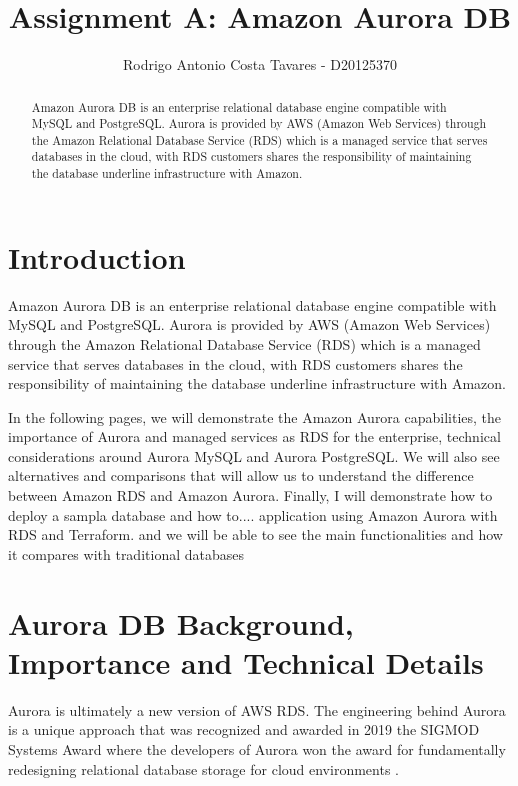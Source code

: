 \documentclass{article}
\date{\parbox{\linewidth}{\centering%
  \today\endgraf\bigskip
  Advanced Databases – TU60 2021/2022 - Brendand Tierney}}
\title  {Assignment A: Amazon Aurora DB}
\author{Rodrigo Antonio Costa Tavares - D20125370}
\begin{document}
\maketitle
\thispagestyle{empty}
\begin{abstract}
Amazon Aurora DB is an enterprise relational database engine compatible with MySQL and PostgreSQL. Aurora is provided by AWS (Amazon Web Services) through the Amazon Relational Database Service (RDS) which is a managed service that serves databases in the cloud, with RDS customers shares the responsibility of maintaining the database underline infrastructure with Amazon.
\end{abstract}

\clearpage
\tableofcontents
\clearpage
\listoffigures
\clearpage

\section{Introduction}

Amazon Aurora DB is an enterprise relational database engine compatible with MySQL and PostgreSQL. Aurora is provided by AWS (Amazon Web Services) through the Amazon Relational Database Service (RDS) which is a managed service that serves databases in the cloud, with RDS customers shares the responsibility of maintaining the database underline infrastructure with Amazon\cite{todorov2013aws}.

In the following pages, we will demonstrate the Amazon Aurora capabilities, the importance of Aurora and managed services as RDS for the enterprise, technical considerations around Aurora MySQL and Aurora PostgreSQL.  We will also see alternatives and comparisons that will allow us to understand the difference between Amazon RDS and Amazon Aurora. Finally, I will demonstrate how to deploy a sampla database and how to.... application using Amazon Aurora with RDS and Terraform. and we will be able to see the main functionalities and how it compares with traditional databases 

\section {Aurora DB Background, Importance and Technical Details}

Aurora is ultimately a new version of AWS RDS. The engineering behind Aurora is a unique approach that was recognized and awarded in 2019 the SIGMOD Systems Award where the developers of Aurora won the award for fundamentally redesigning relational database storage for cloud environments \cite{sigmod2021}. 
\end{document}
